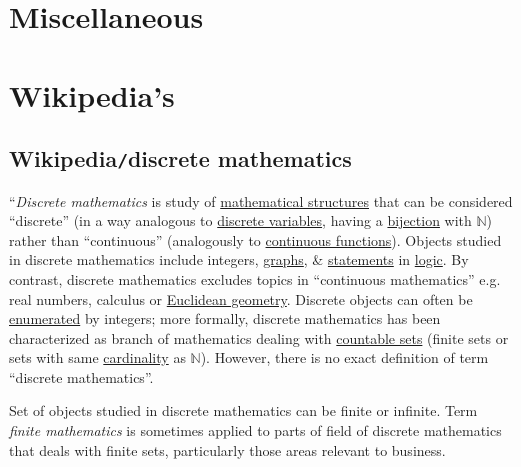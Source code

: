 \documentclass{article}
\begin{document}

\section{Miscellaneous}


\section{Wikipedia's}

\subsection{Wikipedia{\tt/}discrete mathematics}
``{\it Discrete mathematics} is study of \href{https://en.wikipedia.org/wiki/Mathematical_structures}{mathematical structures} that can be considered ``discrete'' (in a way analogous to \href{https://en.wikipedia.org/wiki/Discrete_variable}{discrete variables}, having a \href{https://en.wikipedia.org/wiki/Bijection}{bijection} with $\mathbb{N}$) rather than ``continuous'' (analogously to \href{https://en.wikipedia.org/wiki/Continuous_function}{continuous functions}). Objects studied in discrete mathematics include integers, \href{https://en.wikipedia.org/wiki/Graph_(discrete_mathematics)}{graphs}, \& \href{https://en.wikipedia.org/wiki/Statement_(logic)}{statements} in \href{https://en.wikipedia.org/wiki/Mathematical_logic}{logic}. By contrast, discrete mathematics excludes topics in ``continuous mathematics'' e.g. real numbers, calculus or \href{https://en.wikipedia.org/wiki/Euclidean_geometry}{Euclidean geometry}. Discrete objects can often be \href{https://en.wikipedia.org/wiki/Enumeration}{enumerated} by integers; more formally, discrete mathematics has been characterized as branch of mathematics dealing with \href{https://en.wikipedia.org/wiki/Countable_set}{countable sets} (finite sets or sets with same \href{https://en.wikipedia.org/wiki/Cardinality}{cardinality} as $\mathbb{N}$). However, there is no exact definition of term ``discrete mathematics''.

Set of objects studied in discrete mathematics can be finite or infinite. Term {\it finite mathematics} is sometimes applied to parts of field of discrete mathematics that deals with finite sets, particularly those areas relevant to business.
\end{document}
